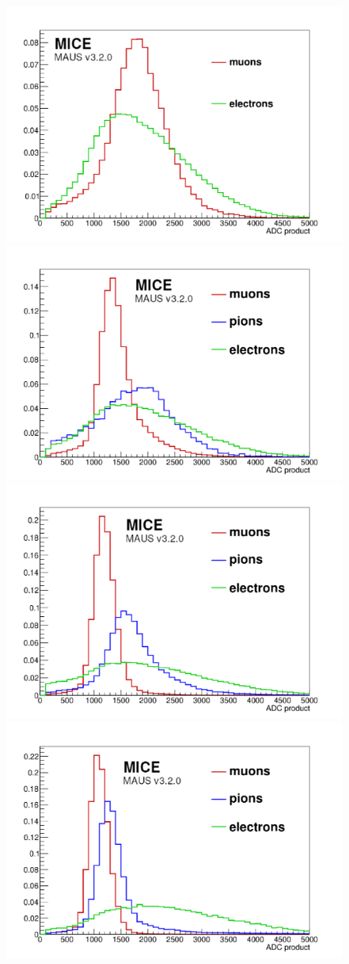 
\begin{figure}[htb!]
 	\begin{center}
		\includegraphics[width=0.45\columnwidth]{./04-KL/Figures/mu_vs_e_140MEV.pdf}
 		\includegraphics[width=0.45\columnwidth]{./04-KL/Figures/mu_vs_pi_vs_e_170MEV.pdf} 
 		\includegraphics[width=0.45\columnwidth]{./04-KL/Figures/mu_vs_pi_vs_e_200MEV.pdf} 		
 		\includegraphics[width=0.45\columnwidth]{./04-KL/Figures/mu_vs_pi_vs_e_240MEV.pdf}  	

\end{center}
\end{figure}
